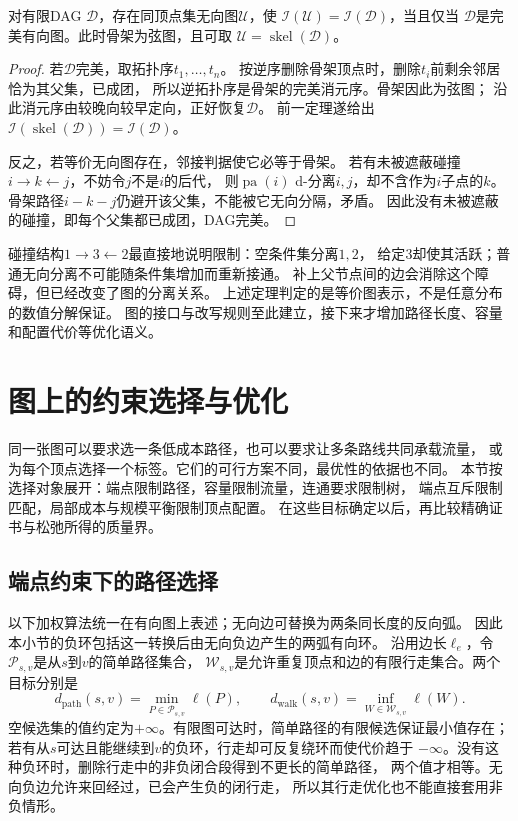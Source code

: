 \begin{theorem}[有向图的完美无向图表示]
  \label{thm:graph-theory-perfect-undirected}
  对有限DAG \(\mathcal D\)，存在同顶点集无向图\(\mathcal U\)，使
  \(\mathcal I(\mathcal U)=\mathcal I(\mathcal D)\)，当且仅当
  \(\mathcal D\)是完美有向图。此时骨架为弦图，且可取
  \(\mathcal U=\operatorname{skel}(\mathcal D)\)。
\end{theorem}

\begin{proof}
若\(\mathcal D\)完美，取拓扑序\(t_1,\ldots,t_n\)。
按逆序删除骨架顶点时，删除\(t_i\)前剩余邻居恰为其父集，已成团，
所以逆拓扑序是骨架的完美消元序。骨架因此为弦图；
沿此消元序由较晚向较早定向，正好恢复\(\mathcal D\)。
前一定理遂给出
\(\mathcal I(\operatorname{skel}(\mathcal D))=\mathcal I(\mathcal D)\)。

反之，若等价无向图存在，邻接判据使它必等于骨架。
若有未被遮蔽碰撞\(i\to k\leftarrow j\)，不妨令\(j\)不是\(i\)的后代，
则\(\operatorname{pa}(i)\) d-分离\(i,j\)，却不含作为\(i\)子点的\(k\)。
骨架路径\(i-k-j\)仍避开该父集，不能被它无向分隔，矛盾。
因此没有未被遮蔽的碰撞，即每个父集都已成团，DAG完美。
\end{proof}

碰撞结构\(1\to3\leftarrow2\)最直接地说明限制：空条件集分离\(1,2\)，
给定\(3\)却使其活跃；普通无向分离不可能随条件集增加而重新接通。
补上父节点间的边会消除这个障碍，但已经改变了图的分离关系。
上述定理判定的是等价图表示，不是任意分布的数值分解保证。
图的接口与改写规则至此建立，接下来才增加路径长度、容量和配置代价等优化语义。

\section{图上的约束选择与优化}
\label{sec:graph-theory-exact-approximate-algorithms}

同一张图可以要求选一条低成本路径，也可以要求让多条路线共同承载流量，
或为每个顶点选择一个标签。它们的可行方案不同，最优性的依据也不同。
本节按选择对象展开：端点限制路径，容量限制流量，连通要求限制树，
端点互斥限制匹配，局部成本与规模平衡限制顶点配置。
在这些目标确定以后，再比较精确证书与松弛所得的质量界。

\subsection{端点约束下的路径选择}
\label{sec:graph-theory-shortest-paths}

以下加权算法统一在有向图上表述；无向边可替换为两条同长度的反向弧。
因此本小节的负环包括这一转换后由无向负边产生的两弧有向环。
沿用边长\(\ell_e\)，令\(\mathcal P_{s,v}\)是从\(s\)到\(v\)的简单路径集合，
\(\mathcal W_{s,v}\)是允许重复顶点和边的有限行走集合。两个目标分别是
\[
  d_{\mathrm{path}}(s,v)=\min_{P\in\mathcal P_{s,v}}\ell(P),
  \qquad
  d_{\mathrm{walk}}(s,v)=\inf_{W\in\mathcal W_{s,v}}\ell(W).
\]
空候选集的值约定为\(+\infty\)。有限图可达时，简单路径的有限候选保证最小值存在；
若有从\(s\)可达且能继续到\(v\)的负环，行走却可反复绕环而使代价趋于
\(-\infty\)。没有这种负环时，删除行走中的非负闭合段得到不更长的简单路径，
两个值才相等。无向负边允许来回经过，已会产生负的闭行走，
所以其行走优化也不能直接套用非负情形。

